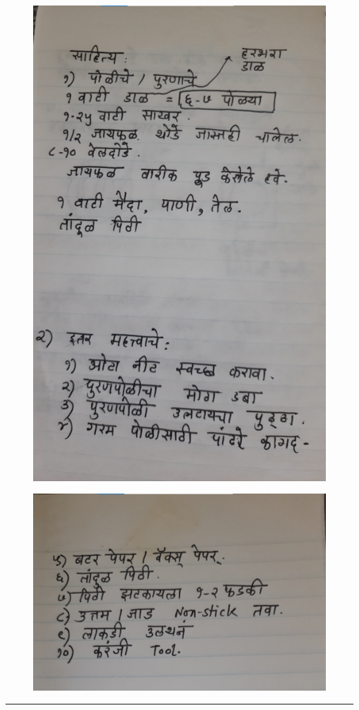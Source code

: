 \documentclass[17pt]{extarticle}  %
\begin{document}
\begin{figure}[h!]
    \centering
    \includegraphics{img/17-s.png}
\end{figure}
\begin{figure}[h!]
    \centering
    \includegraphics{img/18-s.png}
\end{figure}

\vspace{5mm}
\hrule
\end{document}
